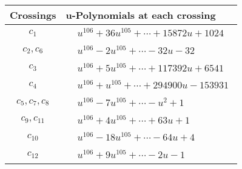 \documentclass[1p]{elsarticle_modified}
\theoremstyle{definition}
\begin{document}
\begin{tabular}{m{50pt}|m{274pt}}
Crossings & \hspace{64pt}u-Polynomials at each crossing \\
\hline $$\begin{aligned}c_{1}\end{aligned}$$&$\begin{aligned}
&u^{106}+36 u^{105}+\cdots+15872 u+1024
\end{aligned}$\\
\hline $$\begin{aligned}c_{2},c_{6}\end{aligned}$$&$\begin{aligned}
&u^{106}-2 u^{105}+\cdots-32 u-32
\end{aligned}$\\
\hline $$\begin{aligned}c_{3}\end{aligned}$$&$\begin{aligned}
&u^{106}+5 u^{105}+\cdots+117392 u+6541
\end{aligned}$\\
\hline $$\begin{aligned}c_{4}\end{aligned}$$&$\begin{aligned}
&u^{106}+u^{105}+\cdots+294900 u-153931
\end{aligned}$\\
\hline $$\begin{aligned}c_{5},c_{7},c_{8}\end{aligned}$$&$\begin{aligned}
&u^{106}-7 u^{105}+\cdots- u^2+1
\end{aligned}$\\
\hline $$\begin{aligned}c_{9},c_{11}\end{aligned}$$&$\begin{aligned}
&u^{106}+4 u^{105}+\cdots+63 u+1
\end{aligned}$\\
\hline $$\begin{aligned}c_{10}\end{aligned}$$&$\begin{aligned}
&u^{106}-18 u^{105}+\cdots-64 u+4
\end{aligned}$\\
\hline $$\begin{aligned}c_{12}\end{aligned}$$&$\begin{aligned}
&u^{106}+9 u^{105}+\cdots-2 u-1
\end{aligned}$\\
\hline
\end{tabular}\\~\\
\end{document}
